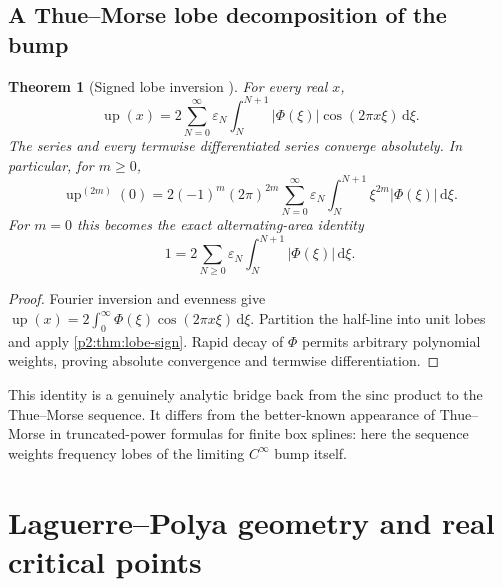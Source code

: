 \documentclass[11pt]{article}
\numberwithin{equation}{section}
\newtheorem{theorem}{Theorem}[section]
\theoremstyle{definition}
\theoremstyle{remark}
\newcommand{\Up}{\operatorname{up}}
\newcommand{\dd}{\,\mathrm d}
\begin{document}
\subsection{A Thue--Morse lobe decomposition of the bump}

\begin{theorem}[Signed lobe inversion \NewResult]
\label{p2:thm:lobe-inversion}
For every real $x$,
\begin{equation}
 \Up(x)=2\sum_{N=0}^{\infty}\varepsilon_N
 \int_N^{N+1}|\Phi(\xi)|\cos(2\pi x\xi)\dd\xi.             \label{p2:eq:lobe-inversion}
\end{equation}
The series and every termwise differentiated series converge absolutely.  In
particular, for $m\ge0$,
\begin{equation}
 \Up^{(2m)}(0)=2(-1)^m(2\pi)^{2m}
 \sum_{N=0}^{\infty}\varepsilon_N
 \int_N^{N+1}\xi^{2m}|\Phi(\xi)|\dd\xi.                  \label{p2:eq:lobe-moments}
\end{equation}
For $m=0$ this becomes the exact alternating-area identity
\begin{equation}
 1=2\sum_{N\ge0}\varepsilon_N\int_N^{N+1}|\Phi(\xi)|\dd\xi.                \label{p2:eq:area}
\end{equation}
\end{theorem}

\begin{proof}
Fourier inversion and evenness give
$\Up(x)=2\int_0^\infty\Phi(\xi)\cos(2\pi x\xi)\dd\xi$.
Partition the half-line into unit lobes and apply \cref{p2:thm:lobe-sign}.
Rapid decay of $\Phi$ permits arbitrary polynomial weights, proving absolute
convergence and termwise differentiation.
\end{proof}

This identity is a genuinely analytic bridge back from the sinc product to the
Thue--Morse sequence.  It differs from the better-known appearance of
Thue--Morse in truncated-power formulas for finite box splines: here the sequence
weights frequency lobes of the limiting $C^\infty$ bump itself.

\section{Laguerre--Polya geometry and real critical points}
\label{p2:sec:LP}
\end{document}
